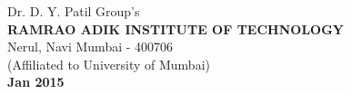 \begin{center}
\vspace{0.6in}
\small Dr. D. Y. Patil Group's \\
\vspace{0.1in}
\textbf {RAMRAO ADIK INSTITUTE OF TECHNOLOGY}\\
\vspace{0.1in}
\small Nerul, Navi Mumbai - 400706\\
\vspace{0.1in}
\small (Affiliated to University of Mumbai)\\
\vspace{0.1in}
\small  \textbf {Jan 2015}
\end{center}










